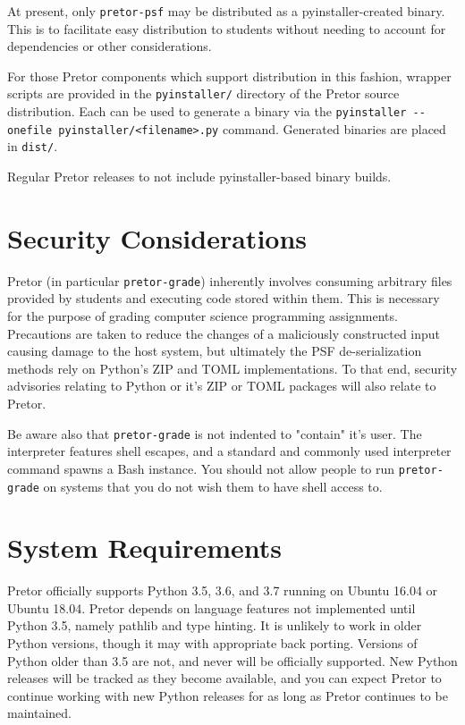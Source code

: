 \documentclass{book}
\begin{document}
At present, only \texttt{pretor-psf} may be distributed as a
pyinstaller-created binary. This is to facilitate easy distribution to students
without needing to account for dependencies or other considerations.

For those Pretor components which support distribution in this fashion, wrapper
scripts are provided in the \texttt{pyinstaller/} directory of the Pretor
source distribution. Each can be used to generate a binary via the
\texttt{pyinstaller -{}-onefile pyinstaller/<filename>.py} command. Generated
binaries are placed in \texttt{dist/}.

Regular Pretor releases to not include pyinstaller-based binary builds.

\section{Security Considerations}

Pretor (in particular \texttt{pretor-grade}) inherently involves consuming
arbitrary files provided by students and executing code stored within them.
This is necessary for the purpose of grading computer science programming
assignments. Precautions are taken to reduce the changes of a maliciously
constructed input causing damage to the host system, but ultimately the
PSF de-serialization methods rely on Python's ZIP and TOML implementations.
To that end, security advisories relating to Python or it's ZIP or TOML
packages will also relate to Pretor.

Be aware also that \texttt{pretor-grade} is not indented to "contain" it's
user.  The interpreter features shell escapes, and a standard and commonly used
interpreter command spawns a Bash instance. You should not allow people to run
\texttt{pretor-grade} on systems that you do not wish them to have shell access
to.

\section{System Requirements}

Pretor officially supports Python 3.5, 3.6, and 3.7 running on Ubuntu 16.04 or
Ubuntu 18.04. Pretor depends on language features not implemented until Python
3.5, namely pathlib and type hinting. It is unlikely to work in older Python
versions, though it may with appropriate back porting. Versions of Python older
than 3.5 are not, and never will be officially supported. New Python releases
will be tracked as they become available, and you can expect Pretor to continue
working with new Python releases for as long as Pretor continues to be
maintained.
\end{document}
